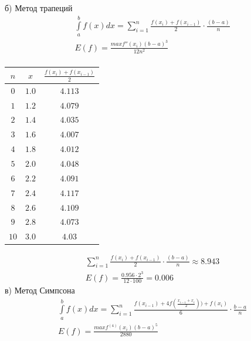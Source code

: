 \documentclass[a4paper,11pt]{article}
\begin{document}
б) Метод трапеций
\begin{gather*}
\int\limits_a^b f(x) dx = \sum_{i = 1}^{n} \frac{f(x_i) + f(x_{i - 1})}2 \cdot \frac{(b - a)}{n} \\
E(f) = \frac{maxf''(x_i)(b - a)^3}{12n^2} \\[2pt]
\end{gather*}
\begin{center}
	\begin{tabular}{|c|c|c|}
		\hline
		$ n $ & $ x $ & $ \frac{f(x_i) + f(x_{i - 1})}2 $ \\[2pt]
		\hline
		$ 0 $  &   $ 1.0 $   &   $ 4.113 $  \\[2pt]
		\hline
		$ 1 $  &   $ 1.2 $   &   $ 4.079 $     \\[2pt]
		\hline
		$ 2 $  &   $ 1.4 $   &   $ 4.035 $     \\[2pt]
		\hline
		$ 3 $  &   $ 1.6 $   &   $ 4.007 $      \\[2pt]
		\hline
		$ 4 $  &   $ 1.8 $   &   $ 4.012 $      \\[2pt]
		\hline
		$ 5 $  &   $ 2.0 $   &   $ 4.048 $      \\[2pt]
		\hline
		$ 6 $  &   $ 2.2 $   &   $ 4.091 $      \\[2pt]
		\hline
		$ 7 $  &   $ 2.4 $   &   $ 4.117 $      \\[2pt]
		\hline
		$ 8 $  &   $ 2.6 $   &   $ 4.109 $      \\[2pt]
		\hline
		$ 9 $  &   $ 2.8 $   &   $ 4.073 $      \\[2pt]
		\hline
		$ 10 $  &   $ 3.0 $   &   $ 4.03 $      \\[2pt]
		\hline
	\end{tabular}
\end{center}
\begin{gather*}
\sum_{i = 1}^{n} \frac{f(x_i) + f(x_{i - 1})}2 \cdot \frac{(b - a)}{n} \approx 8.943 \\
E(f) = \frac{0.956 \cdot 2^3}{12 \cdot 100} = 0.006
\end{gather*}
в) Метод Симпсона
\begin{gather*}
\int\limits_a^b f(x) dx = \sum_{i = 1}^{n} \frac{f(x_{i - 1}) + 4f(\frac{x_{i - 1} + x_i}2)) + f(x_i)}{6} \cdot \frac{b - a}{n} \\[2pt]
E(f) = \frac{maxf^{(4)}(x_i)(b - a)^5}{2880} \\[2pt]
\end{gather*}
\end{document}
